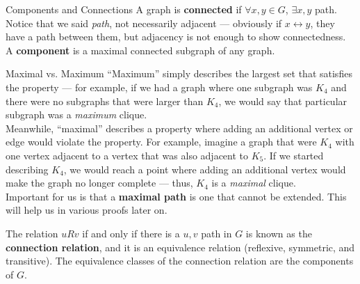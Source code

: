 \documentclass[10pt]{extarticle}
\begin{document}
\begin{problem}{Components and Connections}
  A graph is \textbf{connected} if $\forall x,y\in G$, $\exists x,y$ path. Notice that we said \textit{path}, not necessarily adjacent --- obviously if $x\leftrightarrow y$, they have a path between them, but adjacency is not enough to show connectedness.\\

  A \textbf{component} is a maximal connected subgraph of any graph.
  \begin{problem}{Maximal vs. Maximum}
    ``Maximum'' simply describes the largest set that satisfies the property --- for example, if we had a graph where one subgraph was $K_4$ and there were no subgraphs that were larger than $K_4$, we would say that particular subgraph was a \textit{maximum} clique.\\

    Meanwhile, ``maximal'' describes a property where adding an additional vertex or edge would violate the property. For example, imagine a graph that were $K_4$ with one vertex adjacent to a vertex that was also adjacent to $K_5$. If we started describing $K_4$, we would reach a point where adding an additional vertex would make the graph no longer complete --- thus, $K_4$ is a \textit{maximal} clique.\\

    Important for us is that a \textbf{maximal path} is one that cannot be extended. This will help us in various proofs later on.
  \end{problem}
  The relation $uRv$ if and only if there is a $u,v$ path in $G$ is known as the \textbf{connection relation}, and it is an equivalence relation (reflexive, symmetric, and transitive). The equivalence classes of the connection relation are the components of $G$.
\end{problem}
\end{document}
